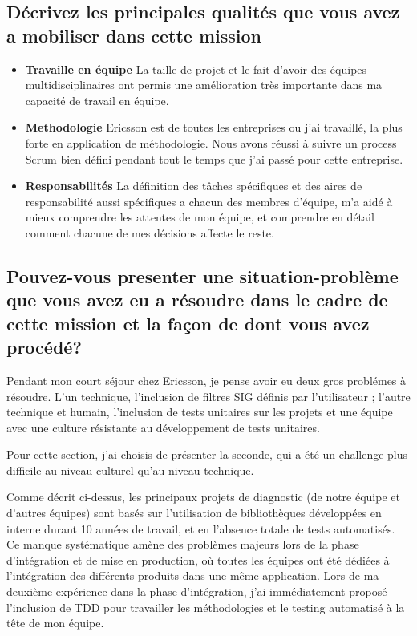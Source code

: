\documentclass{resume} %
\begin{document}
			
\subsection{Décrivez les principales qualités que vous avez a mobiliser dans cette mission}
	
		\begin{itemize} 				
			\item \textbf{Travaille en équipe} \newline
				La taille de projet et le fait d'avoir des équipes multidisciplinaires ont permis une amélioration très importante dans ma capacité de travail en équipe. 
			\item \textbf{Methodologie} \newline
				Ericsson est de toutes les entreprises ou j'ai travaill\'e, la plus forte en application de méthodologie. Nous avons réussi \`a suivre un process Scrum bien défini pendant tout le temps que j'ai passé pour cette entreprise.  
			\item \textbf{Responsabilités  } \newline
				La définition des tâches spécifiques et des aires de responsabilité aussi spécifiques a chacun des membres  d'équipe, m'a aidé \`a mieux comprendre les attentes de mon équipe, et comprendre en détail comment chacune de mes décisions affecte le reste.  
		\end{itemize}
		
\subsection{Pouvez-vous presenter une situation-problème que vous avez eu a résoudre dans le cadre de cette mission et la façon de dont vous avez procédé?}

	Pendant mon court séjour chez Ericsson, je pense avoir eu deux gros problémes à résoudre. L'un technique, l'inclusion de filtres SIG définis par l'utilisateur ; l'autre technique et humain, l'inclusion de tests unitaires sur les projets et une équipe avec une culture résistante au développement de tests unitaires.
	
Pour cette section, j'ai choisis de présenter la seconde, qui a été un challenge plus difficile au niveau culturel qu'au niveau technique. 

Comme décrit ci-dessus, les principaux projets de diagnostic (de notre équipe et d'autres équipes) sont basés sur l'utilisation de bibliothèques développées en interne durant 10 années de travail, et en l'absence totale de tests automatisés.
Ce manque systématique amène des problèmes majeurs lors de la phase d'intégration et de mise en production, où toutes les équipes ont été dédiées à l'intégration des différents produits dans une même application.
Lors de ma deuxième expérience dans la phase d'intégration, j'ai immédiatement proposé l'inclusion de TDD pour travailler les méthodologies et le testing automatisé à la tête de mon équipe.
\end{document}
